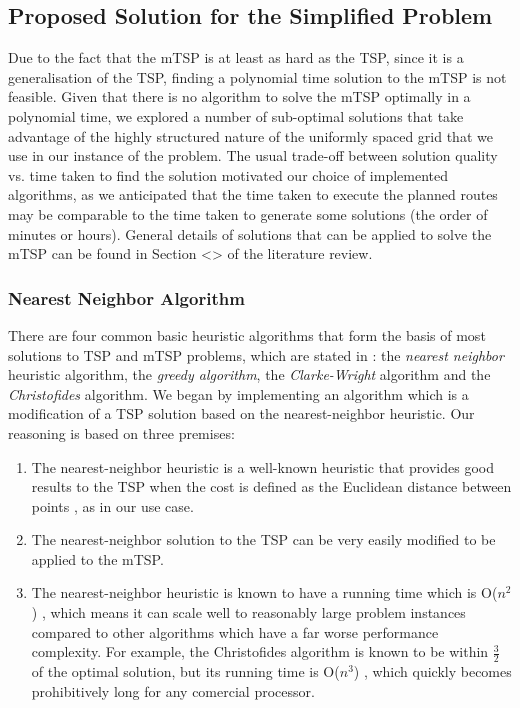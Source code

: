\subsection{Proposed Solution for the Simplified Problem}
Due to the fact that the mTSP is at least as hard as the TSP, since it is a generalisation of the TSP, finding a polynomial time solution to the mTSP is not feasible. Given that there is no algorithm to solve the mTSP optimally in a polynomial time, we explored a number of sub-optimal solutions that take advantage of the highly structured nature of the uniformly spaced grid that we use in our instance of the problem. The usual trade-off between solution quality vs. time taken to find the solution motivated our choice of implemented algorithms, as we anticipated that the time taken to execute the planned routes may be comparable to the time taken to generate some solutions (the order of minutes or hours). General details of solutions that can be applied to solve the mTSP can be found in Section <> of the literature review.

\subsubsection{Nearest Neighbor Algorithm}
There are four common basic heuristic algorithms that form the basis of most solutions to TSP and mTSP problems, which are stated in \cite{Johnson1997TheOptimization}: the \textit{nearest neighbor} heuristic algorithm, the \textit{ greedy algorithm}, the \textit{ Clarke-Wright} algorithm and the \textit{Christofides} algorithm. We began by implementing an algorithm which is a modification of a TSP solution based on the nearest-neighbor heuristic. Our reasoning is based on three premises:
\begin{enumerate}
    \item The nearest-neighbor heuristic is a well-known heuristic that provides good results to the TSP when the cost is defined as the Euclidean distance between points \cite{Johnson1995TheOptimization}, as in our use case.
    \item The nearest-neighbor solution to the TSP can be very easily modified to be applied to the mTSP.
    \item The nearest-neighbor heuristic is known to have a running time which is O($n^2$) \cite{Rosenkrantz1977AnProblem}, which means it can scale well to reasonably large problem instances compared to other algorithms which have a far worse performance complexity. For example, the Christofides algorithm is known to be within $\frac{3}{2}$ of the optimal solution, but its running time is O($n^3$) \cite{Christofides1976WORST-CASEPROBLEM}, which quickly becomes prohibitively long for any comercial processor.
\end{enumerate}

